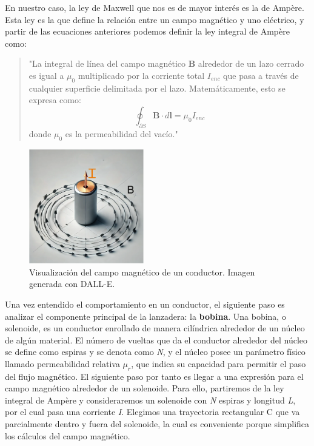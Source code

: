 En nuestro caso, la ley de Maxwell que nos es de mayor interés es la de Ampère. Esta ley es la que define la relación entre un campo magnético y uno eléctrico, y partir de las ecuaciones anteriores podemos definir la ley integral de Ampère como:

\begin{quote}
    "La integral de línea del campo magnético \(\mathbf{B}\) alrededor de un lazo cerrado es igual a \(\mu_0\) multiplicado por la corriente total \(I_{enc}\) que pasa a través de cualquier superficie delimitada por el lazo. Matemáticamente, esto se expresa como:
    \[
    \oint_{\partial S} \mathbf{B} \cdot d\mathbf{l} = \mu_0 I_{enc}
    \]
    donde \(\mu_0\) es la permeabilidad del vacío."
\end{quote}

\begin{figure}[H]
    \centering %
    \includegraphics[width=5cm]{FigurasMemoria/amperelaw.png}
    \caption{Visualización del campo magnético de un conductor. Imagen generada con DALL-E.}
    \label{fig:amperelaw} %
\end{figure}

Una vez entendido el comportamiento en un conductor, el siguiente paso es analizar el componente principal de la lanzadera: la \textbf{bobina}. Una bobina, o solenoide, es un conductor enrollado de manera cilíndrica alrededor de un núcleo de algún material. El número de vueltas que da el conductor alrededor del núcleo se define como espiras y se denota como \textit{N}, y el núcleo posee un parámetro físico llamado permeabilidad relativa \textit{\(\mu_r\)}, que indica su capacidad para permitir el paso del flujo magnético. El siguiente paso por tanto es llegar a una expresión para el campo magnético alrededor de un solenoide. Para ello, partiremos de la ley integral de Ampère y consideraremos un solenoide con \textit{N} espiras y longitud \textit{L}, por el cual pasa una corriente \textit{I}. Elegimos una trayectoria rectangular C que va parcialmente dentro y fuera del solenoide, la cual es conveniente porque simplifica los cálculos del campo magnético.

